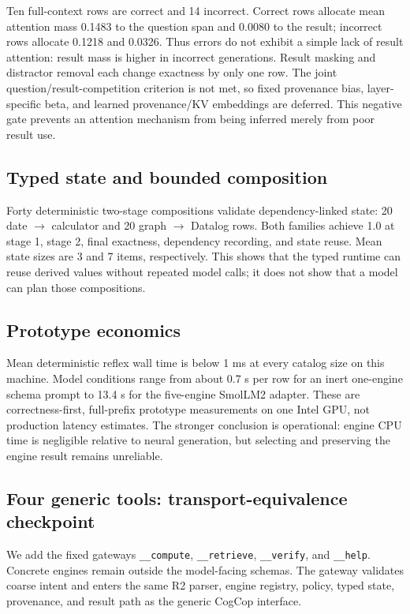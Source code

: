 \documentclass[10pt]{article}
\begin{document}
Ten full-context rows are correct and 14 incorrect.  Correct rows allocate mean
attention mass 0.1483 to the question span and 0.0080 to the result; incorrect
rows allocate 0.1218 and 0.0326.  Thus errors do not exhibit a simple lack of
result attention: result mass is higher in incorrect generations.  Result
masking and distractor removal each change exactness by only one row.  The joint
question/result-competition criterion is not met, so fixed provenance bias,
layer-specific beta, and learned provenance/KV embeddings are deferred.  This
negative gate prevents an attention mechanism from being inferred merely from
poor result use.

\subsection{Typed state and bounded composition}

Forty deterministic two-stage compositions validate dependency-linked state:
20 date $\rightarrow$ calculator and 20 graph $\rightarrow$ Datalog rows.  Both
families achieve 1.0 at stage 1, stage 2, final exactness, dependency recording,
and state reuse.  Mean state sizes are 3 and 7 items, respectively.  This shows
that the typed runtime can reuse derived values without repeated model calls; it
does not show that a model can plan those compositions.

\subsection{Prototype economics}

Mean deterministic reflex wall time is below 1 ms at every catalog size on this
machine.  Model conditions range from about 0.7 s per row for an inert one-engine
schema prompt to 13.4 s for the five-engine SmolLM2 adapter.  These are
correctness-first, full-prefix prototype measurements on one Intel GPU, not
production latency estimates.  The stronger conclusion is operational: engine
CPU time is negligible relative to neural generation, but selecting and
preserving the engine result remains unreliable.

\subsection{Four generic tools: transport-equivalence checkpoint}

We add the fixed gateways \texttt{\_\_compute}, \texttt{\_\_retrieve},
\texttt{\_\_verify}, and \texttt{\_\_help}. Concrete engines remain outside
the model-facing schemas. The gateway validates coarse intent and enters the
same R2 parser, engine registry, policy, typed state, provenance, and result path
as the generic CogCop interface.
\end{document}
